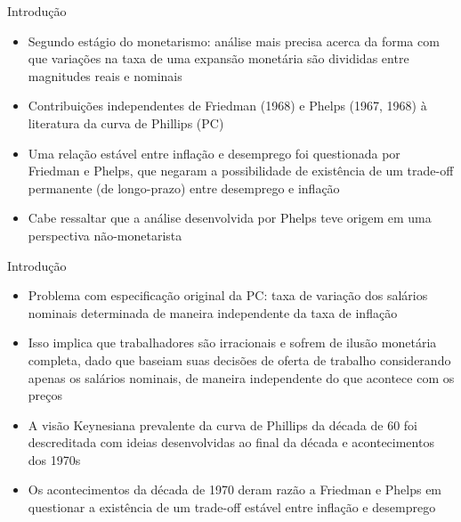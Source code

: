 \documentclass[10pt]{beamer}
\begin{document}
\begin{frame}{Introdução}
    \begin{itemize}
        \item Segundo estágio do monetarismo: análise mais precisa acerca da forma com que variações na taxa de uma expansão monetária são divididas entre magnitudes reais e nominais
        \bigskip
        \item Contribuições independentes de Friedman (1968) e Phelps (1967, 1968) à literatura da curva de Phillips (PC)
        \bigskip
        \item Uma relação estável entre inflação e desemprego foi questionada por Friedman e Phelps, que negaram a possibilidade de existência de um trade-off permanente (de longo-prazo) entre desemprego e inflação
        \bigskip
        \item Cabe ressaltar que a análise desenvolvida por Phelps teve origem em uma perspectiva não-monetarista
    \end{itemize}
\end{frame}

\begin{frame}{Introdução}
    \begin{itemize}
        \item Problema com especificação original da PC: taxa de variação dos salários nominais determinada de maneira independente da taxa de inflação
        \bigskip
        \item Isso implica que trabalhadores são irracionais e sofrem de ilusão monetária completa, dado que baseiam suas decisões de oferta de trabalho considerando apenas os salários nominais, de maneira independente do que acontece com os preços
        \bigskip
        \item A visão Keynesiana prevalente da curva de Phillips da década de 60 foi descreditada com ideias desenvolvidas ao final da década e acontecimentos dos 1970s
        \bigskip
        \item Os acontecimentos da década de 1970 deram razão a Friedman e Phelps em questionar a existência de um trade-off estável entre inflação e desemprego
    \end{itemize}
\end{frame}
\end{document}
